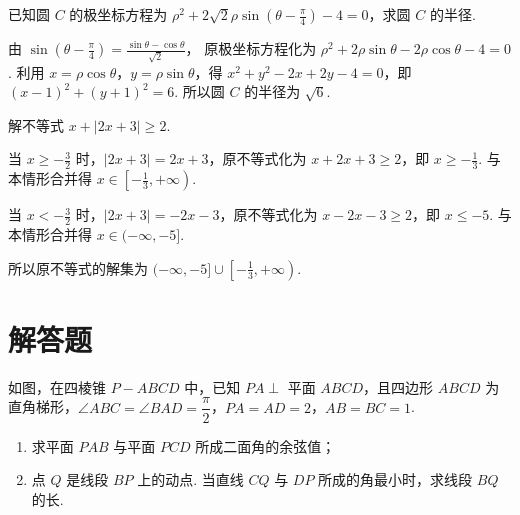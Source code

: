 \reuseproblemnumber
\begin{problem}[C]
已知圆 \(C\) 的极坐标方程为 \(\rho^2 + 2\sqrt{2}\rho \sin \left(\theta - \frac{\pi}{4}\right) - 4 = 0\)，求圆 \(C\) 的半径.
\end{problem}

\begin{solution}
由 \(\sin\left(\theta-\frac{\pi}{4}\right)=\frac{\sin\theta-\cos\theta}{\sqrt2}\)，
原极坐标方程化为 \(\rho^2+2\rho\sin\theta-2\rho\cos\theta-4=0\).
利用 \(x=\rho\cos\theta\)，\(y=\rho\sin\theta\)，得 \(x^2+y^2-2x+2y-4=0\)，即 \((x-1)^2+(y+1)^2=6\).
所以圆 \(C\) 的半径为 \(\sqrt6\).
\end{solution}

\reuseproblemnumber
\begin{problem}[D]
解不等式 \(x + |2x + 3| \ge 2\).
\end{problem}

\begin{solution}
当 \(x\geqslant-\frac32\) 时，\(|2x+3|=2x+3\)，原不等式化为 \(x+2x+3\geqslant2\)，即 \(x\geqslant-\frac13\). 与本情形合并得 \(x\in\left[-\frac13,+\infty\right)\).

当 \(x<-\frac32\) 时，\(|2x+3|=-2x-3\)，原不等式化为 \(x-2x-3\geqslant2\)，即 \(x\leqslant-5\). 与本情形合并得 \(x\in(-\infty,-5]\).

所以原不等式的解集为 \((-\infty,-5]\cup\left[-\frac13,+\infty\right)\).
\end{solution}



\section{解答题}

\begin{problem}
如图，在四棱锥 \(P-ABCD\) 中，已知 \(PA \perp\) 平面 \(ABCD\)，且四边形 \(ABCD\) 为直角梯形，\(\angle ABC = \angle BAD = \dfrac{\pi}{2}\)，\(PA = AD = 2\)，\(AB = BC = 1\).
\begin{enumerate}
\item 求平面 \(PAB\) 与平面 \(PCD\) 所成二面角的余弦值；
\item 点 \(Q\) 是线段 \(BP\) 上的动点. 当直线 \(CQ\) 与 \(DP\) 所成的角最小时，求线段 \(BQ\) 的长.
\end{enumerate}

\end{problem}

